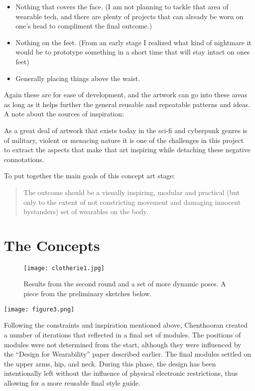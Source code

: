 \begin{itemize}
  \item Nothing that covers the face. (I am not planning to tackle that area of wearable tech, and there are plenty of projects that can already be worn on one’s head to compliment the final outcome.)
  \item Nothing on the feet. (From an early stage I realized what kind of nightmare it would be to prototype something in a short time that will stay intact on ones feet)
  \item Generally placing things above the waist.
\end{itemize}

Again these are for ease of development, and the artwork can go into these areas as long as it helps further the general reusable and repeatable patterns and ideas.
A note about the sources of inspiration:

As a great deal of artwork that exists today in the sci-fi and cyberpunk genres is of military, violent or menacing nature it is one of the challenges in this project to extract the aspects that make that art inspiring while detaching these negative connotations.

To put together the main goals of this concept art stage:

\begin{quote}
The outcome should be a visually inspiring, modular and practical (but only to the extent of not constricting movement and damaging innocent bystanders) set of wearables on the body.
\end{quote}

\section{The Concepts}

\begin{figure}
  \texttt{[image: clotherie1.jpg]}
  \caption{Results from the second round and a set of more dynamic poses. A piece from the preliminary sketches below.}
  \label{fig:secondround}
\end{figure}

\begin{marginfigure}
  \texttt{[image: figure3.png]}
  \label{fig:secondround}
\end{marginfigure}

Following the constraints and inspiration mentioned above, Chenthooran created a number of iterations that reflected in a final set of modules. The positions of modules were not determined from the start, although they were influenced by the ``Design for Wearability'' paper \citep{Gemperle98} described earlier. The final modules settled on the upper arms, hip, and neck. During this phase, the design has been intentionally left without the influence of physical electronic restrictions, thus allowing for a more reusable final style guide.

